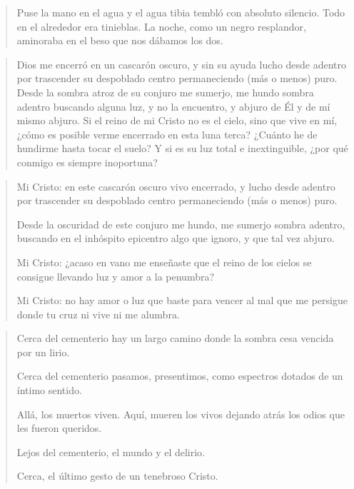 \documentclass[a4paper, 12pt]{article}
\begin{document}
\newpage 

\begin{verse}
    Puse la mano en el agua 
    y el agua tibia tembló
    con absoluto silencio.
    Todo en el alrededor
    era tinieblas. La noche,
    como un negro resplandor,
    aminoraba en el beso
    que nos dábamos los dos.
\end{verse}


\pagebreak 

\begin{verse}
    Dios me encerró en un cascarón oscuro,
    y sin su ayuda lucho desde adentro
    por trascender su despoblado centro
    permaneciendo (más o menos) puro.
    Desde la sombra atroz de su conjuro
    me sumerjo, me hundo sombra adentro
    buscando alguna luz, y no la encuentro,
    y abjuro de Él y de mí mismo abjuro.
    Si el reino de mi Cristo no es el cielo,
    sino que vive en mí, ¿cómo es posible 
    verme encerrado en esta luna terca?
    ¿Cuánto he de hundirme hasta tocar el suelo?
    Y si es su luz total e inextinguible,
    ¿por qué conmigo es siempre inoportuna?
\end{verse}


\pagebreak 

\begin{verse}
    Mi Cristo: en este cascarón oscuro 
    vivo encerrado, y lucho desde adentro 
    por trascender su despoblado centro 
    permaneciendo (más o menos) puro.

    Desde la oscuridad de este conjuro 
    me hundo, me sumerjo sombra adentro,
    buscando en el inhóspito epicentro
    algo que ignoro, y que tal vez abjuro.

    Mi Cristo: ¿acaso en vano me enseñaste 
    que el reino de los cielos se consigue 
    llevando luz y amor a la penumbra? 

    Mi Cristo: no hay amor o luz que baste 
    para vencer al mal que me persigue 
    donde tu cruz ni vive ni me alumbra.
\end{verse}


\pagebreak 

\begin{verse}
    Cerca del cementerio
    hay un largo camino
    donde la sombra cesa
    vencida por un lirio.

    Cerca del cementerio
    pasamos, presentimos,
    como espectros dotados
    de un íntimo sentido.

    Allá, los muertos viven.
    Aquí, mueren los vivos
    dejando atrás los odios
    que les fueron queridos.

    Lejos del cementerio,
    el mundo y el delirio.

    Cerca, el último gesto 
    de un tenebroso Cristo.
\end{verse}
\end{document}
